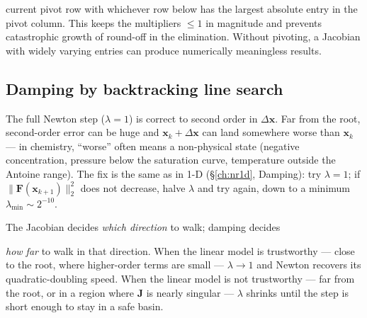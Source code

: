 \documentclass[11pt,a4paper]{article}
\newcommand{\xv}{\mathbf{x}}
\newcommand{\Fv}{\mathbf{F}}
\newcommand{\Jac}{\mathbf{J}}
\begin{document}
current pivot row with whichever row below has the largest absolute
entry in the pivot column.  This keeps the multipliers $\le 1$ in
magnitude and prevents catastrophic growth of round-off in the
elimination.  Without pivoting, a Jacobian with widely varying
entries can produce numerically meaningless results.

\subsection{Damping by backtracking line search}

The full Newton step ($\lambda = 1$) is correct to second order in
$\Delta\xv$.  Far from the root, second-order error can be huge and
$\xv_k + \Delta\xv$ can land somewhere worse than $\xv_k$ --- in
chemistry, ``worse'' often means a non-physical state (negative
concentration, pressure below the saturation curve, temperature
outside the Antoine range).  The fix is the same as in 1-D
(\S\ref{ch:nr1d}, Damping): try $\lambda = 1$; if
$\|\Fv(\xv_{k+1})\|_2^2$ does not decrease, halve $\lambda$ and try
again, down to a minimum $\lambda_{\min} \sim 2^{-10}$.

\begin{intuition}
The Jacobian decides \emph{which direction} to walk; damping decides


\emph{how far} to walk in that direction.  When the linear model is
trustworthy --- close to the root, where higher-order terms are
small --- $\lambda \to 1$ and Newton recovers its quadratic-doubling
speed.  When the linear model is not trustworthy --- far from the
root, or in a region where $\Jac$ is nearly singular --- $\lambda$
shrinks until the step is short enough to stay in a safe basin.
\end{intuition}
\end{document}

